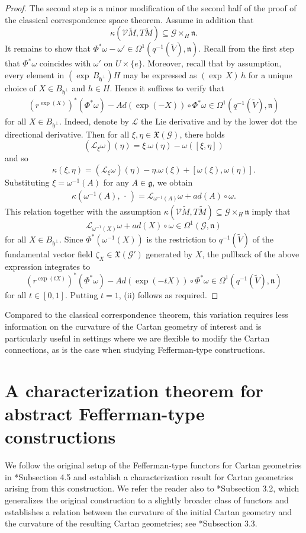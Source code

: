 \documentclass[11pt]{amsart}
\begin{document}
\begin{proof}
The second step is a minor modification of the second half of the proof of the classical correspondence space theorem. Assume in addition that
\[\kappa(\mathcal V\tilde M,T\tilde M)\subseteq\mathcal G\times_H\mathfrak n.\]
It remains to show that $\Phi^*\omega-\omega'\in\Omega^1(q^{-1}(\tilde V),\mathfrak n)$. Recall from the first step that $\Phi^*\omega$ coincides with $\omega'$ on $U\times \{e\}$. Moreover, recall that by assumption, every element in $(\exp\,B_{\mathfrak h^\perp})H$ may be expressed as $(\exp\,X)\,h$ for a unique choice of $X\in B_{\mathfrak h^\perp}$ and $h\in H$. Hence it suffices to verify that
\begin{align*}
    (r^{\exp{(X)}})^*(\Phi^*\omega)-Ad(\exp{(-X)})\circ \Phi^*\omega\in\Omega^1(q^{-1}(\tilde V),\mathfrak n)
\end{align*}
for all $X\in B_{\mathfrak h^\perp}$. Indeed, denote by $\mathcal L$ the Lie derivative and by the lower dot the directional derivative. Then for all $\xi,\eta\in\mathfrak X(\mathcal G)$, there holds
\[(\mathcal L_\xi\omega)(\eta)=\xi.\omega(\eta)-\omega([\xi,\eta])\]
and so
\[\kappa(\xi,\eta)=(\mathcal L_\xi\omega)(\eta)-\eta.\omega(\xi)+[\omega(\xi),\omega(\eta)].\]
Substituting $\xi=\omega^{-1}(A)$ for any $A\in\mathfrak g$, we obtain
\begin{align*}
    \kappa(\omega^{-1}(A),\,\cdot\,)=\mathcal L_{\omega^{-1}(A)}\omega+ad(A)\circ\omega.
\end{align*}
This relation together with the assumption $\kappa(\mathcal V\tilde M,T\tilde M)\subseteq\mathcal G\times_H\mathfrak n$ imply that
\[\mathcal L_{\omega^{-1}(X)}\omega+ad(X)\circ\omega\in\Omega^1(\mathcal G,\mathfrak n)\]
for all $X\in B_{\mathfrak h^\perp}$. Since $\Phi^*(\omega^{-1}(X))$ is the restriction to $q^{-1}(\tilde V)$ of the fundamental vector field $\zeta_X\in\mathfrak X(\mathcal G')$ generated by $X$, the pullback of the above expression integrates to
\[(r^{\exp{(tX)}})^*(\Phi^*\omega)-Ad(\exp{(-tX)})\circ \Phi^*\omega\in\Omega^1(q^{-1}(\tilde V),\mathfrak n)\]
for all $t\in [0,1]$. Putting $t=1$, (ii) follows as required.
\end{proof}
Compared to the classical correspondence theorem, this variation requires less information on the curvature of the Cartan geometry of interest and is particularly useful in settings where we are flexible to modify the Cartan connections, as is the case when studying Fefferman-type constructions.

\section{A characterization theorem for abstract Fefferman-type constructions}\label{section abstract Fefferman}
We follow the original setup of the Fefferman-type functors for Cartan geometries in \cite{Cap06}*{Subsection 4.5} and establish a characterization result for Cartan geometries arising from this construction. We refer the reader also to \cite{CZ09}*{Subsection 3.2}, which generalizes the original construction to a slightly broader class of functors and establishes a relation between the curvature of the initial Cartan geometry and the curvature of the resulting Cartan geometries; see \cite{CZ09}*{Subsection 3.3}.
\end{document}
